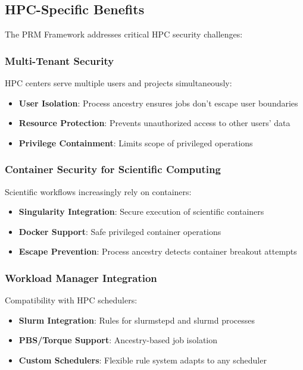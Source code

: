 \documentclass[]{sn-jnl}
\begin{document}
\subsection{HPC-Specific Benefits}

The PRM Framework addresses critical HPC security challenges:

\subsubsection{Multi-Tenant Security}

HPC centers serve multiple users and projects simultaneously:
\begin{itemize}
\item \textbf{User Isolation}: Process ancestry ensures jobs don't escape user
      boundaries
\item \textbf{Resource Protection}: Prevents unauthorized access to other users'
      data
\item \textbf{Privilege Containment}: Limits scope of privileged operations
\end{itemize}

\subsubsection{Container Security for Scientific Computing}

Scientific workflows increasingly rely on containers:
\begin{itemize}
\item \textbf{Singularity Integration}: Secure execution of scientific containers
\item \textbf{Docker Support}: Safe privileged container operations
\item \textbf{Escape Prevention}: Process ancestry detects container breakout attempts
\end{itemize}

\subsubsection{Workload Manager Integration}

Compatibility with HPC schedulers:
\begin{itemize}
\item \textbf{Slurm Integration}: Rules for slurmstepd and slurmd processes
\item \textbf{PBS/Torque Support}: Ancestry-based job isolation
\item \textbf{Custom Schedulers}: Flexible rule system adapts to any scheduler
\end{itemize}
\end{document}
